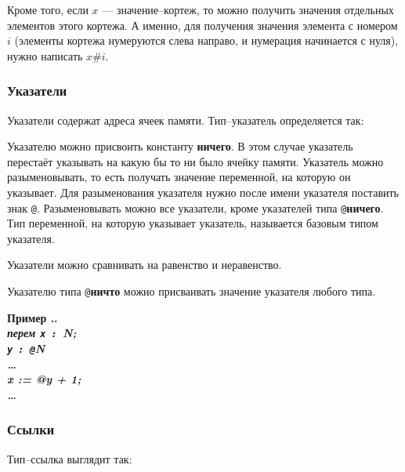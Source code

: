 \documentclass[10pt]{report}
\newcounter{exam}[section]
\renewcommand{\theexam}{\thesection.\arabic{exam}}
\newenvironment{Example}{\par\refstepcounter{exam}\bf Пример \theexam. \sl}{\rm\par}
\begin{document}
Кроме того, если $x$ --- значение--кортеж, то можно получить значения отдельных элементов этого кортежа. А именно, для получения значения элемента с номером $i$ (элементы кортежа нумеруются слева направо, и нумерация начинается с нуля), нужно написать $x\texttt{\#}i$.

        \subsubsection{Указатели}
Указатели содержат адреса ячеек памяти. Тип--указатель определяется так:
\begin{center}
\noindent\textcolor{Green}{}
\end{center}

Указателю можно присвоить константу \textbf{ничего}. В этом случае указатель перестаёт указывать на какую бы то ни было ячейку памяти. Указатель можно разыменовывать, то есть
получать значение переменной, на которую он указывает. Для разыменования указателя нужно после имени указателя поставить знак \texttt{@}. Разыменовывать можно все указатели,
кроме указателей типа \texttt{@}\textbf{ничего}. Тип переменной, на которую указывает указатель, называется базовым типом указателя.

Указатели можно сравнивать на равенство и неравенство. 

Указателю типа \texttt{@}\textbf{ничто} можно присваивать значение указателя любого типа.

\begin{Example}\\
\rm
\textbf{перем} \texttt{x : }\textbf{N};\\
\hspace*{12mm}\texttt{y : @}\textbf{N}\\
\hspace*{12mm}\dots\\
\hspace*{12mm}x := @y + 1;\\
\hspace*{12mm}\dots
\end{Example}

        \subsubsection{Ссылки}
Тип--ссылка выглядит так:        
\begin{center}
\noindent\textcolor{Green}{}
\end{center}
        
\end{document}
